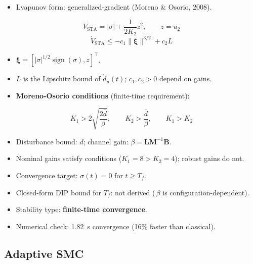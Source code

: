 \documentclass[10pt, a4paper]{article}
\newcommand{\sign}{\operatorname{sign}}
\begin{document}
\begin{itemize}[leftmargin=1.5em,itemsep=0.2em]
  \item Lyapunov form: generalized-gradient (Moreno \& Osorio, 2008).
\end{itemize}
\begin{equation}
  V_\text{STA} = |\sigma| + \frac{1}{2K_2}z^2, \qquad z = u_2
\end{equation}
\begin{equation}
  \dot{V}_\text{STA} \leq -c_1\|\bm{\xi}\|^{3/2} + c_2 L
  \label{eq:lyap_sta}
\end{equation}
\begin{itemize}[leftmargin=1.5em,itemsep=0.2em]
  \item $\bm{\xi} = [|\sigma|^{1/2}\sign(\sigma), z]^\top$.
  \item $L$ is the Lipschitz bound of $\dot{d}_u(t)$; $c_1,c_2>0$ depend on gains.
  \item \textbf{Moreno-Osorio conditions} (finite-time requirement):
\end{itemize}
\begin{equation}
  K_1 > 2\sqrt{\frac{2\bar{d}}{\beta}}, \qquad K_2 > \frac{\bar{d}}{\beta}, \qquad K_1 > K_2
  \label{eq:sta_conditions}
\end{equation}
\begin{itemize}[leftmargin=1.5em,itemsep=0.2em]
  \item Disturbance bound: $\bar{d}$; channel gain: $\beta=\mathbf{L}\mathbf{M}^{-1}\mathbf{B}$.
  \item Nominal gains satisfy conditions ($K_1=8>K_2=4$); robust gains do not.
  \item Convergence target: $\sigma(t)=0$ for $t\ge T_f$.
  \item Closed-form DIP bound for $T_f$: not derived (\,$\beta$ is configuration-dependent).
  \item Stability type: \textbf{finite-time convergence}.
  \item Numerical check: 1.82~s convergence (16\% faster than classical).
\end{itemize}

\subsection{Adaptive SMC}
\end{document}
